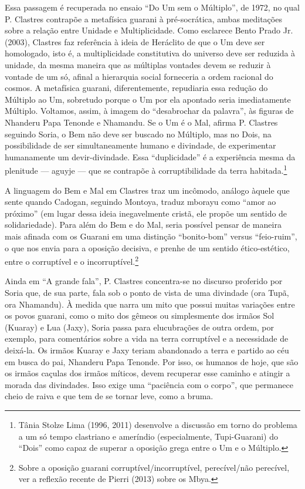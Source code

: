 Essa passagem é recuperada no ensaio ``Do Um sem o Múltiplo'', de 1972, no
qual P. Clastres contrapõe a metafísica guarani à pré-socrática, ambas
meditações sobre a relação entre Unidade e Multiplicidade. Como
esclarece Bento Prado Jr. (2003), Clastres faz referência à ideia de
Heráclito de que o Um deve ser homologado, isto é, a multiplicidade
constitutiva do universo deve ser reduzida à unidade, da mesma maneira
que as múltiplas vontades devem se reduzir à vontade de um só, afinal a
hierarquia social forneceria a ordem racional do cosmos. A metafísica
guarani, diferentemente, repudiaria essa redução do Múltiplo ao Um,
sobretudo porque o Um por ela apontado seria imediatamente Múltiplo.
Voltamos, assim, à imagem do ``desabrochar da palavra'', às figuras de
Nhanderu Papa Tenonde e Nhamandu. Se o Um é o Mal, afirma P. Clastres
seguindo Soria, o Bem não deve ser buscado no Múltiplo, mas no Dois, na
possibilidade de ser simultaneamente humano e divindade, de
experimentar humanamente um devir-divindade. Essa ``duplicidade'' é a
experiência mesma da plenitude --- aguyje --- que se contrapõe à
corruptibilidade da terra habitada.\footnote{Tânia Stolze Lima (1996,
2011) desenvolve a discussão em torno do problema a um só tempo
clastriano e ameríndio (especialmente, Tupi-Guarani) do ``Dois'' como
capaz de superar a oposição grega entre o Um e o Múltiplo.}

A linguagem do Bem e Mal em Clastres traz um incômodo, análogo àquele
que sente quando Cadogan, seguindo Montoya, traduz mborayu como ``amor
ao próximo'' (em lugar dessa ideia inegavelmente cristã, ele propõe um sentido
de solidariedade). Para além do Bem e do Mal, seria
possível pensar de maneira mais afinada com os Guarani em uma distinção
``bonito-bom'' versus ``feio-ruim'', o que nos envia para a oposição decisiva,
e prenhe de um sentido ético-estético, entre o corruptível e o
incorruptível.\footnote{Sobre a oposição guarani
corruptível/incorruptível, perecível/não perecível, ver a reflexão
recente de Pierri (2013) sobre os Mbya. } 

Ainda em ``A grande fala'', P. Clastres concentra-se no discurso proferido
por Soria que, de sua parte, fala sob o ponto de vista de uma divindade
(ora Tupã, ora Nhamandu). À medida que narra um mito que possui muitas
variações entre os povos guarani, como o mito dos gêmeos ou
simplesmente dos irmãos Sol (Kuaray) e Lua (Jaxy), Soria passa para
elucubrações de outra ordem, por exemplo, para comentários sobre a vida
na terra corruptível e a necessidade de deixá-la. Os irmãos Kuaray e
Jaxy teriam abandonado a terra e partido ao céu em busca do pai,
Nhanderu Papa Tenonde. Por isso, os humanos de hoje, que são os irmãos
caçulas dos irmãos míticos, devem recuperar esse caminho e atingir a
morada das divindades. Isso exige uma ``paciência com o corpo'', que
permanece cheio de raiva e que tem de se tornar leve, como a bruma. 

